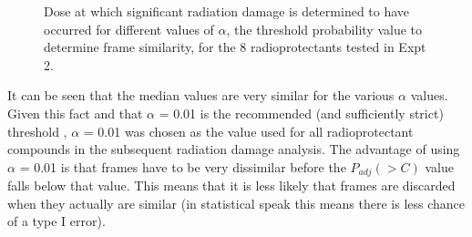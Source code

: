 \begin{figure}
\begin{subfigure}[b]{0.75\textwidth}
            \caption{}
            \label{}
    \end{subfigure}
    \caption[Dose at which significant radiation damage is determined to have occurred for different values of $\alpha$, the threshold probability value to determine frame similarity.]{Dose at which significant radiation damage is determined to have occurred for different values of $\alpha$, the threshold probability value to determine frame similarity, for the 8 radioprotectants tested in Expt 2.}
    \label{fig:alpha threshold value test}
\end{figure}
It can be seen that the median values are very similar for the various $\alpha$ values.
Given this fact and that $\alpha$ = 0.01 is the recommended (and sufficiently strict) threshold \cite{franke2015correlation}, $\alpha$ = 0.01 was chosen as the value used for all radioprotectant compounds in the subsequent radiation damage analysis.
The advantage of using $\alpha$ = 0.01 is that frames have to be very dissimilar before the $P_{adj}(>C)$ value falls below that value.
This means that it is less likely that frames are discarded when they actually are similar (in statistical speak this means there is less chance of a type I error).
